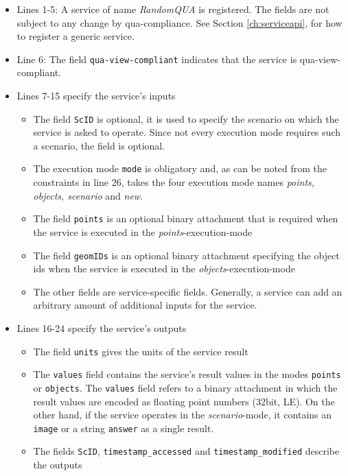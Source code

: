 \begin{itemize}
  \item Lines 1-5: A service of name \emph{RandomQUA} is registered. The fields are not subject to any change by qua-compliance. See Section \ref{ch:serviceapi}, for how to register a generic service.
  \item Line 6: The field \texttt{qua-view-compliant} indicates that the service is qua-view-compliant.
  \item Lines 7-15 specify the service's inputs
    \begin{itemize}
      \item The field \texttt{ScID} is optional, it is used to specify the scenario on which the service is asked to operate. Since not every execution mode requires such a scenario, the field is optional.
      \item The execution mode \texttt{mode} is obligatory and, as can be noted from the constraints in line 26, takes the four execution mode names \emph{points, objects, scenario} and \emph{new}.
      \item The field \texttt{points} is an optional binary attachment that is required when the service is executed in the \emph{points}-execution-mode
      \item The field \texttt{geomIDs} is an optional binary attachment specifying the object ids when the service is executed in the \emph{objects}-execution-mode
      \item The other fields are service-specific fields. Generally, a service can add an arbitrary amount of additional inputs for the service.
    \end{itemize}
  \item Lines 16-24 specify the service's outputs
    \begin{itemize}
      \item The field \texttt{units} gives the units of the service result
      \item The \texttt{values} field contains the service's result values in the modes \texttt{points} or \texttt{objects}.
        The \texttt{values} field refers to a binary attachment in which the result values are encoded as floating point numbers (32bit, LE).
        On the other hand, if the service operates in the \emph{scenario}-mode,
it contains an \texttt{image} or a string \texttt{answer} as a single result.
      \item The fields \texttt{ScID}, \texttt{timestamp\_accessed} and \texttt{timestamp\_modified} describe the outputs

\end{itemize}
\end{itemize}
